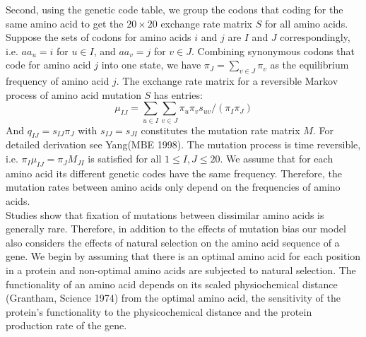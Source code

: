 \documentclass[13pt]{article}
\begin{document}
Second, using the genetic code table, we group the codons that coding for the same amino acid to get the $20 \times 20$ exchange rate matrix $S$ for all amino acids. Suppose the sets of codons for amino acids $i$ and $j$ are $I$ and $J$ correspondingly, i.e. $aa_u = i$ for $u \in I$, and $aa_v = j$ for $v \in J$. Combining synonymous codons that code for amino acid $j$ into one state, we have $\pi_J = \sum_{v \in J} \pi_v$ as the equilibrium frequency of amino acid $j$. The exchange rate matrix for a reversible Markov process of amino acid mutation $S$ has entries:
\[\mu_{IJ} = \sum_{u \in I} \sum_{v \in J} \pi_u \pi_v s_{uv} / (\pi_I \pi_J)\]
\noindent
And $q_{IJ} = s_{IJ} \pi_J$ with $s_{IJ}  = s_{JI}$ constitutes the mutation rate matrix $M$. For detailed derivation see Yang(MBE 1998). The mutation process is time reversible, i.e. $\pi_I \mu_{IJ} = \pi_J M_{JI}$ is satisfied for all $1 \le I,J \le 20$. We assume that for each amino acid its different genetic codes have the same frequency. Therefore, the mutation rates between amino acids only depend on the frequencies of amino acids. \\

Studies show that fixation of mutations between dissimilar amino acids is generally rare. Therefore, in addition to the effects of mutation bias our model also considers the effects of natural selection on the amino acid sequence of a gene. We begin by assuming that there is an optimal amino acid for each position in a protein and non-optimal amino acids are subjected to natural selection. The functionality of an amino acid depends on its scaled physiochemical distance (Grantham, Science 1974) from the optimal amino acid, the sensitivity of the protein's functionality to the physicochemical distance and the protein production rate of the gene. \\
\end{document}
